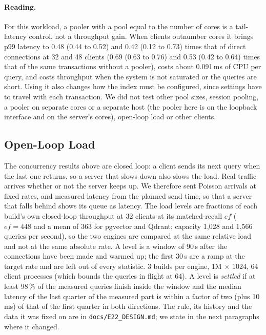 \documentclass[preprint,12pt]{elsarticle}
\begin{document}
\paragraph{Reading.} For this workload, a pooler with a pool equal to the number of cores is a tail-latency control, not a
throughput gain. When clients outnumber cores it brings p99 latency to 0.48 (0.44 to 0.52) and 0.42 (0.12 to 0.73) times that of direct connections
at 32 and 48 clients (0.69 (0.63 to 0.76) and 0.53 (0.42 to 0.64) times that of the same transactions without a pooler), costs about
0.091\,ms of CPU per query, and costs throughput when the system is not saturated or the queries are short. Using it also changes how the index must be configured, since
settings have to travel with each transaction. We did not test other pool sizes, session pooling, a pooler on separate cores
or a separate host (the pooler here is on the loopback interface and on the server's cores), open-loop load or other clients.


\subsection{Open-Loop Load}
\label{sec:openloop}

The concurrency results above are closed loop: a client sends its next query when the last one returns, so a server that slows
down also slows the load. Real traffic arrives whether or not the server keeps up. We therefore sent Poisson arrivals at fixed rates,
and measured latency from the planned send time, so that a server that falls behind shows its queue as latency. The load levels are
fractions of each build's own closed-loop throughput at 32 clients at its matched-recall $ef$ ($ef=448$ and a mean of $363$ for
pgvector and Qdrant; capacity 1{,}028 and 1{,}566 queries per second), so the two engines are compared at the same relative load and
not at the same absolute rate. A level is a window of 90\,s after the connections have been made and warmed up; the first 30\,s are a ramp at the
target rate and are left out of every statistic. 3 builds per engine, 1M $\times$ 1024, 64 client processes (which bounds the
queries in flight at 64). A level is \emph{settled} if at least 98\,\% of the measured queries finish inside the window and the median
latency of the last quarter of the measured part is within a factor of two (plus 10\,ms) of that of the first quarter in both directions. The
rule, its history and the data it was fixed on are in \texttt{docs/E22\_DESIGN.md}; we state in the next paragraphs where it changed.
\end{document}

